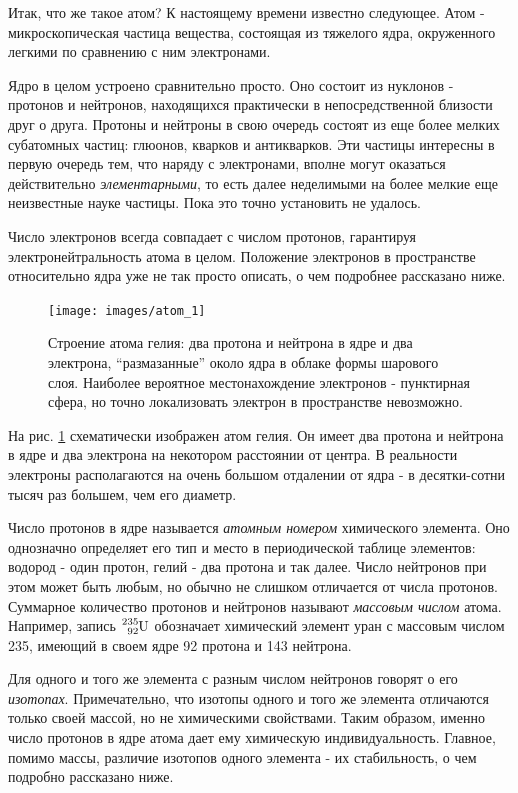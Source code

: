 Итак, что же такое атом? К настоящему времени известно следующее.
Атом - микроскопическая частица вещества, состоящая из тяжелого ядра, окруженного легкими по сравнению с ним электронами.

Ядро в целом устроено сравнительно просто.
Оно состоит из нуклонов - протонов и нейтронов, находящихся практически в непосредственной близости друг о друга.
Протоны и нейтроны в свою очередь состоят из еще более мелких субатомных частиц: глюонов, кварков и антикварков.
Эти частицы интересны в первую очередь тем, что наряду с электронами, вполне могут оказаться действительно \textit{элементарными}, то есть далее неделимыми на более мелкие еще неизвестные науке частицы.
Пока это точно установить не удалось.

Число электронов всегда совпадает с числом протонов, гарантируя электронейтральность атома в целом.
Положение электронов в пространстве относительно ядра уже не так просто описать, о чем подробнее рассказано ниже.

\begin{figure}[t!]
   \centering
   \texttt{[image: images/atom\_1]}
   \caption{Строение атома гелия: два протона и нейтрона в ядре и два электрона, ``размазанные'' около ядра в облаке формы шарового слоя. Наиболее вероятное местонахождение электронов - пунктирная сфера, но точно локализовать электрон в пространстве невозможно.}
   \label{fig:atom_1}
\end{figure}

На рис. \ref{fig:atom_1} схематически изображен атом гелия.
Он имеет два протона и нейтрона в ядре и два электрона на некотором расстоянии от центра.
В реальности электроны располагаются на очень большом отдалении от ядра - в десятки-сотни тысяч раз большем, чем его диаметр.

Число протонов в ядре называется \textit{атомным номером} химического элемента.
Оно однозначно определяет его тип и место в периодической таблице элементов: водород - один протон, гелий - два протона и так далее.
Число нейтронов при этом может быть любым, но обычно не слишком отличается от числа протонов.
Суммарное количество протонов и нейтронов называют \textit{массовым числом} атома.
Например, запись $\ce{^{235}_{92}U}$ обозначает химический элемент уран с массовым числом 235, имеющий в своем ядре 92 протона и 143 нейтрона.

Для одного и того же элемента с разным числом нейтронов говорят о его \textit{изотопах}.
Примечательно, что изотопы одного и того же элемента отличаются только своей массой, но не химическими свойствами.
Таким образом, именно число протонов в ядре атома дает ему химическую индивидуальность.
Главное, помимо массы, различие изотопов одного элемента - их стабильность, о чем подробно рассказано ниже.

